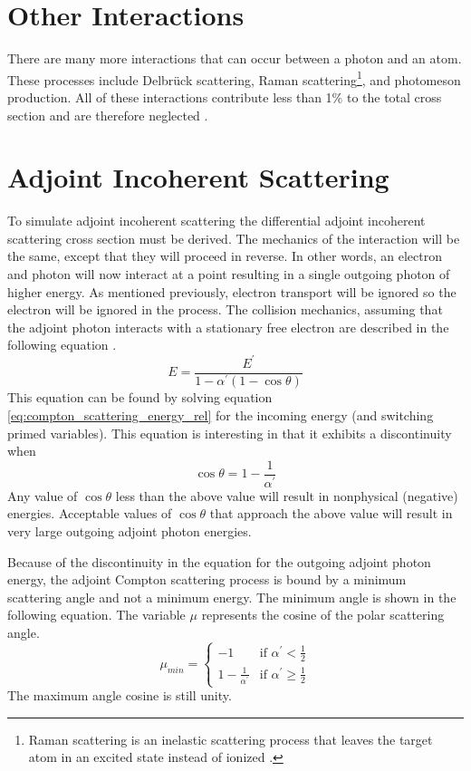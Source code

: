 \section{Other Interactions}
There are many more interactions that can occur between a photon and an atom.
These processes include Delbr\"{u}ck scattering, Raman scattering\footnote{Raman scattering is an inelastic scattering process that leaves the target atom in an excited state instead of ionized \citep{cullen_epdl97_1997}.}, and 
photomeson production. All of these interactions contribute less than 1\% to the
total cross section and are therefore neglected \citep{lux_monte_1991}.

\section{Adjoint Incoherent Scattering}
To simulate adjoint incoherent scattering the differential adjoint incoherent 
scattering cross section must be derived. The mechanics of the interaction will
be the same, except that they will proceed in reverse. In other words, an
electron and photon will now interact at a point resulting in a single outgoing
photon of higher energy. As mentioned previously, electron transport will be
ignored so the electron will be ignored in the process. The collision mechanics,
assuming that the adjoint photon interacts with a stationary free electron are
described in the following equation \citep{gabler_amos_2006}.
\begin{equation}
  E = \frac{E^{'}}{1-\alpha^{'}(1-\cos{\theta})}
\label{eq:adjoint_energy_angle_relation}
\end{equation}
This equation can be found by solving equation 
\ref{eq:compton_scattering_energy_rel} for the incoming energy (and switching
primed variables). This equation is interesting in that it exhibits a 
discontinuity when 
\begin{equation}
  \cos{\theta} = 1 - \frac{1}{\alpha^{'}}
\end{equation}
Any value of $\cos{\theta}$ less than the above value will result in nonphysical
(negative) energies. Acceptable values of $\cos{\theta}$ that approach the 
above value will result in very large outgoing adjoint photon energies. 

Because of the discontinuity in the equation for the outgoing adjoint photon
energy, the adjoint Compton scattering process is bound by a minimum scattering
angle and not a minimum energy. The minimum angle is shown in the following 
equation. The variable $\mu$ represents the cosine of the polar scattering 
angle.
\begin{equation}
  \mu_{min} = 
  \begin{cases}
    -1 & \text{if } \alpha^{'} < \frac{1}{2} \\
    1 - \frac{1}{\alpha^{'}} & \text{if } \alpha^{'} \geq \frac{1}{2} 
  \end{cases}
\end{equation}
The maximum angle cosine is still unity.

